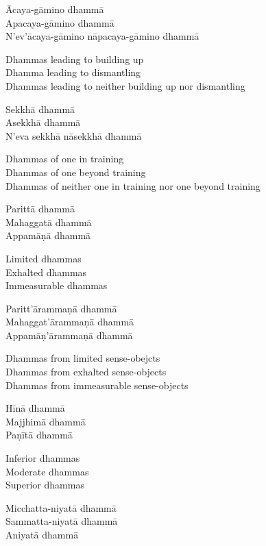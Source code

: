 Ācaya-gāmino dhammā\\
Apacaya-gāmino dhammā\\
N’ev’ācaya-gāmino nāpacaya-gāmino dhammā

\begin{english}
  Dhammas leading to building up\\
  Dhamma leading to dismantling\\
  Dhammas leading to neither building up nor dismantling
\end{english}

Sekkhā dhammā\\
Asekkhā dhammā\\
N’eva sekkhā nāsekkhā dhammā

\begin{english}
  Dhammas of one in training\\
  Dhammas of one beyond training\\
  Dhammas of neither one in training nor one beyond training
\end{english}

Parittā dhammā\\
Mahaggatā dhammā\\
Appamāṇā dhammā

\begin{english}
  Limited dhammas\\
  Exhalted dhammas\\
  Immeasurable dhammas
\end{english}

Paritt’ārammaṇā dhammā\\
Mahaggat’ārammaṇā dhammā\\
Appamāṇ’ārammaṇā dhammā

\begin{english}
  Dhammas from limited sense-obejcts\\
  Dhammas from exhalted sense-objects\\
  Dhammas from immeasurable sense-objects
\end{english}

Hīnā dhammā\\
Majjhimā dhammā\\
Paṇītā dhammā

\begin{english}
  Inferior dhammas\\
  Moderate dhammas\\
  Superior dhammas
\end{english}

Micchatta-niyatā dhammā\\
Sammatta-niyatā dhammā\\
Aniyatā dhammā

